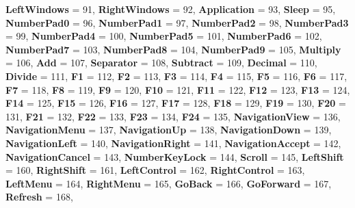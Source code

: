 \begin{DoxyCompactItemize}
{\bfseries Left\+Windows} = 91, 
{\bfseries Right\+Windows} = 92, 
{\bfseries Application} = 93, 
\newline
{\bfseries Sleep} = 95, 
{\bfseries Number\+Pad0} = 96, 
{\bfseries Number\+Pad1} = 97, 
{\bfseries Number\+Pad2} = 98, 
\newline
{\bfseries Number\+Pad3} = 99, 
{\bfseries Number\+Pad4} = 100, 
{\bfseries Number\+Pad5} = 101, 
{\bfseries Number\+Pad6} = 102, 
\newline
{\bfseries Number\+Pad7} = 103, 
{\bfseries Number\+Pad8} = 104, 
{\bfseries Number\+Pad9} = 105, 
{\bfseries Multiply} = 106, 
\newline
{\bfseries Add} = 107, 
{\bfseries Separator} = 108, 
{\bfseries Subtract} = 109, 
{\bfseries Decimal} = 110, 
\newline
{\bfseries Divide} = 111, 
{\bfseries F1} = 112, 
{\bfseries F2} = 113, 
{\bfseries F3} = 114, 
\newline
{\bfseries F4} = 115, 
{\bfseries F5} = 116, 
{\bfseries F6} = 117, 
{\bfseries F7} = 118, 
\newline
{\bfseries F8} = 119, 
{\bfseries F9} = 120, 
{\bfseries F10} = 121, 
{\bfseries F11} = 122, 
\newline
{\bfseries F12} = 123, 
{\bfseries F13} = 124, 
{\bfseries F14} = 125, 
{\bfseries F15} = 126, 
\newline
{\bfseries F16} = 127, 
{\bfseries F17} = 128, 
{\bfseries F18} = 129, 
{\bfseries F19} = 130, 
\newline
{\bfseries F20} = 131, 
{\bfseries F21} = 132, 
{\bfseries F22} = 133, 
{\bfseries F23} = 134, 
\newline
{\bfseries F24} = 135, 
{\bfseries Navigation\+View} = 136, 
{\bfseries Navigation\+Menu} = 137, 
{\bfseries Navigation\+Up} = 138, 
\newline
{\bfseries Navigation\+Down} = 139, 
{\bfseries Navigation\+Left} = 140, 
{\bfseries Navigation\+Right} = 141, 
{\bfseries Navigation\+Accept} = 142, 
\newline
{\bfseries Navigation\+Cancel} = 143, 
{\bfseries Number\+Key\+Lock} = 144, 
{\bfseries Scroll} = 145, 
{\bfseries Left\+Shift} = 160, 
\newline
{\bfseries Right\+Shift} = 161, 
{\bfseries Left\+Control} = 162, 
{\bfseries Right\+Control} = 163, 
{\bfseries Left\+Menu} = 164, 
\newline
{\bfseries Right\+Menu} = 165, 
{\bfseries Go\+Back} = 166, 
{\bfseries Go\+Forward} = 167, 
{\bfseries Refresh} = 168, 
\newline

\end{DoxyCompactItemize}
